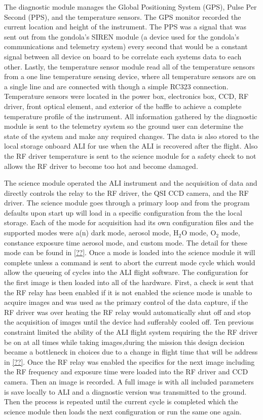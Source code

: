 The diagnostic module manages the Global Positioning System (GPS), Pulse Per Second (PPS), and the temperature sensors. The GPS monitor recorded the current location and height of the instrument. The PPS was a signal that was sent out from the gondola's SIREN module (a device used for the gondola's communications and telemetry system) every second that would be a constant signal between all device on board to be correlate each systems data to each other. Lastly, the temperature sensor module read all of the temperature sensors from a one line temperature sensing device, where all temperature sensors are on a single line and are connected with though a simple RC323 connection. Temperature sensors were located in the power box, electronics box, CCD, RF driver, front optical element, and exterior of the baffle to achieve a complete temperature profile of the instrument. All information gathered by the diagnostic module is sent to the telemetry system so the ground user can determine the state of the system and make any required changes. The data is also stored to the local storage onboard ALI for use when the ALI is recovered after the flight. Also the RF driver temperature is sent to the science module for a safety check to not allows the RF driver to become too hot and become damaged.

The science module operated the ALI instrument and the acquisition of data and directly controls the relay to the RF driver, the QSI CCD camera, and the RF driver. The science module goes through a primary loop and from the program defaults upon start up will load in a specific configuration from the the local storage. Each of the mode for acquisition had its own configuration files and the supported modes were a(n) dark mode, aerosol mode, H$_{2}$O mode, O$_{2}$ mode, constance exposure time aerosol mode, and custom mode. The detail for these mode can be found in \autoref{??}. Once a mode is loaded into the science module it will complete unless a command is sent to abort the current mode cycle which would allow the queueing of cycles into the ALI flight software. The configuration for the first image is then loaded into all of the hardware. First, a check is sent that the RF relay has been enabled if it is not enabled the science mode is unable to acquire images and was used as the primary control of the data capture, if the RF driver was over heating the RF relay would automatically shut off and stop the acquisition of images until the device had sufferably cooled off. Ten previous constraint limited the ability of the ALI flight system requiring the the RF driver be on at all times while taking images,during the mission this design decision became a bottleneck in choices due to a change in flight time that will be address in \autoref{??}. Once the RF relay was enabled the specifics for the next image including the RF frequency and exposure time were loaded into the RF driver and CCD camera. Then an image is recorded. A full image is with all included parameters is save locally to ALI and a diagnostic version was transmitted to the ground. Then the process is repeated until the current cycle is completed which the science module then loads the next configuration or run the same one again.

